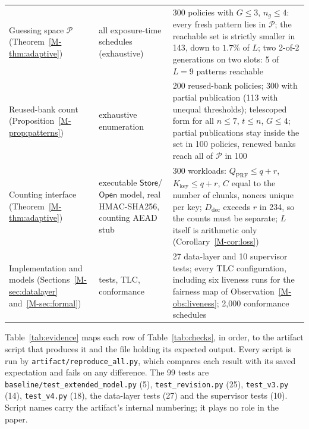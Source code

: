 \documentclass[pdflatex,sn-mathphys-num]{sn-jnl}
\newcommand{\code}[1]{\texttt{#1}}
\theoremstyle{plain}
\begin{document}
\begin{table}[htbp]
\begin{tabularx}{\linewidth}{@{}>{\raggedright\arraybackslash}p{.22\linewidth}>{\raggedright\arraybackslash}p{.22\linewidth}Y@{}}
Guessing space $\mathcal P$ (Theorem~\ref{M-thm:adaptive}) & all exposure-time schedules (exhaustive) & 300 policies with $G\le3$, $n_g\le4$: every fresh pattern lies in $\mathcal P$; the reachable set is strictly smaller in 143, down to $1.7\%$ of $L$; two 2-of-2 generations on two slots: 5 of $L=9$ patterns reachable\\
Reused-bank count (Proposition~\ref{M-prop:patterns}) & exhaustive enumeration & 200 reused-bank policies; 300 with partial publication (113 with unequal thresholds); telescoped form for all $n\le7$, $t\le n$, $G\le4$; partial publications stay inside the set in 100 policies, renewed banks reach all of $\mathcal P$ in 100\\
Counting interface (Theorem~\ref{M-thm:adaptive}) & executable $\mathsf{Store}$/$\mathsf{Open}$ model, real HMAC-SHA256, counting AEAD stub & 300 workloads: $Q_{\mathrm{PRF}}\le q+r$, $K_{\mathrm{key}}\le q+r$, $C$ equal to the number of chunks, nonces unique per key; $D_{\mathrm{dec}}$ exceeds $r$ in 234, so the counts must be separate; $L$ itself is arithmetic only (Corollary~\ref{M-cor:loss})\\
Implementation and models (Sections~\ref{M-sec:datalayer} and~\ref{M-sec:formal}) & tests, TLC, conformance & 27 data-layer and 10 supervisor tests; every TLC configuration, including six liveness runs for the fairness map of Observation~\ref{M-obs:liveness}; 2,000 conformance schedules\\\bottomrule
\end{tabularx}
\end{table}


Table~\ref{tab:evidence} maps each row of Table~\ref{tab:checks}, in order, to the artifact script that produces it and the file holding its expected output. Every script is run by \code{artifact/reproduce\_all.py}, which compares each result with its saved expectation and fails on any difference. The 99 tests are \code{baseline/test\_extended\_model.py} (5), \code{test\_revision.py} (25), \code{test\_v3.py} (14), \code{test\_v4.py} (18), the data-layer tests (27) and the supervisor tests (10). Script names carry the artifact's internal numbering; it plays no role in the paper.
\end{document}
